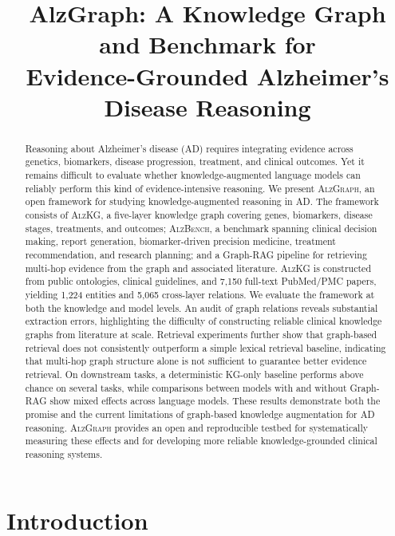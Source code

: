 \documentclass{article}
\title{\textbf{AlzGraph}: A Knowledge Graph and Benchmark for\\ Evidence-Grounded Alzheimer's Disease Reasoning}
\author{}
\begin{document}
\maketitle

\begin{abstract}
Reasoning about Alzheimer's disease (AD) requires integrating evidence across genetics, biomarkers, disease progression, treatment, and clinical outcomes. Yet it remains difficult to evaluate whether knowledge-augmented language models can reliably perform this kind of evidence-intensive reasoning. We present \textsc{AlzGraph}, an open framework for studying knowledge-augmented reasoning in AD. The framework consists of \textsc{AlzKG}, a five-layer knowledge graph covering genes, biomarkers, disease stages, treatments, and outcomes; \textsc{AlzBench}, a benchmark spanning clinical decision making, report generation, biomarker-driven precision medicine, treatment recommendation, and research planning; and a Graph-RAG pipeline for retrieving multi-hop evidence from the graph and associated literature. \textsc{AlzKG} is constructed from public ontologies, clinical guidelines, and 7{,}150 full-text PubMed/PMC papers, yielding 1{,}224 entities and 5{,}065 cross-layer relations.
We evaluate the framework at both the knowledge and model levels. An audit of graph relations reveals substantial extraction errors, highlighting the difficulty of constructing reliable clinical knowledge graphs from literature at scale. Retrieval experiments further show that graph-based retrieval does not consistently outperform a simple lexical retrieval baseline, indicating that multi-hop graph structure alone is not sufficient to guarantee better evidence retrieval. On downstream tasks, a deterministic KG-only baseline performs above chance on several tasks, while comparisons between models with and without Graph-RAG show mixed effects across language models. These results demonstrate both the promise and the current limitations of graph-based knowledge augmentation for AD reasoning. \textsc{AlzGraph} provides an open and reproducible testbed for systematically measuring these effects and for developing more reliable knowledge-grounded clinical reasoning systems.
\end{abstract}


\section{Introduction}
\end{document}
